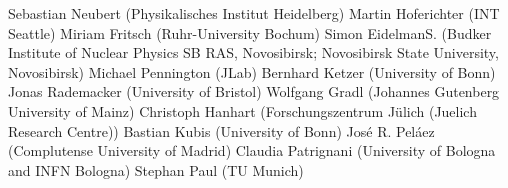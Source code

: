 Sebastian Neubert (Physikalisches Institut Heidelberg)
Martin Hoferichter (INT Seattle) 
Miriam Fritsch (Ruhr-University Bochum)
Simon EidelmanS. (Budker Institute of Nuclear Physics SB RAS, Novosibirsk; Novosibirsk State University, Novosibirsk)
Michael Pennington (JLab)
Bernhard Ketzer (University of Bonn)
Jonas Rademacker (University of Bristol)
Wolfgang Gradl (Johannes Gutenberg University of Mainz)
Christoph Hanhart (Forschungszentrum Jülich (Juelich Research Centre))
Bastian Kubis (University of Bonn)
José R. Peláez (Complutense University of Madrid)
Claudia Patrignani (University of Bologna and INFN Bologna)
Stephan Paul (TU Munich)